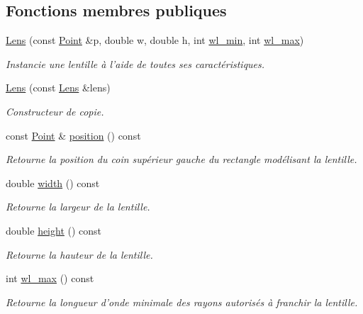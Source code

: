 \subsection*{Fonctions membres publiques}
\begin{DoxyCompactItemize}
\item 
\hyperlink{classLens_a314445802fc5ed95bdd6b715282f6825}{Lens} (const \hyperlink{classPoint}{Point} \&p, double w, double h, int \hyperlink{classLens_aee260137e02f65dd1e3daf3ce21a85c2}{wl\+\_\+min}, int \hyperlink{classLens_a0ffa3d4a046dd6d31ddc549bd91bc25d}{wl\+\_\+max})
\begin{DoxyCompactList}\small\item\em Instancie une lentille à l'aide de toutes ses caractéristiques. \end{DoxyCompactList}\item 
\hyperlink{classLens_a3912f09431d56887039ae7feaf1fa169}{Lens} (const \hyperlink{classLens}{Lens} \&lens)
\begin{DoxyCompactList}\small\item\em Constructeur de copie. \end{DoxyCompactList}\item 
const \hyperlink{classPoint}{Point} \& \hyperlink{classLens_a162d1b06824dbbac8c221ebfec0e0816}{position} () const 
\begin{DoxyCompactList}\small\item\em Retourne la position du coin supérieur gauche du rectangle modélisant la lentille. \end{DoxyCompactList}\item 
double \hyperlink{classLens_afcccf7e103a81ae4fbe5e14c9dc4e0a6}{width} () const 
\begin{DoxyCompactList}\small\item\em Retourne la largeur de la lentille. \end{DoxyCompactList}\item 
double \hyperlink{classLens_a827d7ce14d1dfbd66b46e94cb1d6a794}{height} () const 
\begin{DoxyCompactList}\small\item\em Retourne la hauteur de la lentille. \end{DoxyCompactList}\item 
int \hyperlink{classLens_a0ffa3d4a046dd6d31ddc549bd91bc25d}{wl\+\_\+max} () const 
\begin{DoxyCompactList}\small\item\em Retourne la longueur d'onde minimale des rayons autorisés à franchir la lentille. \end{DoxyCompactList}\item 

\end{DoxyCompactItemize}
